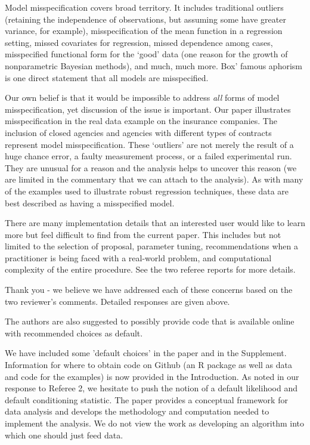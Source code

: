 \documentclass{article}
\newcommand{\response}[1]{{\color{blue}#1}}
\begin{document}
\response{Model misspecification covers broad territory.  It includes traditional outliers (retaining the independence of observations, but assuming some have greater variance, for example), misspecification of the mean function in a regression setting, missed covariates for regression, missed dependence among cases, misspecified functional form for the `good' data (one reason for the growth of nonparametric Bayesian methods), and much, much more.  Box' famous aphorism is one direct statement that all models are misspecified.  

Our own belief is that it would be impossible to address {\em all} forms of model misspecification, yet discussion of the issue is important.  Our paper illustrates misspecification in the real data example on the insurance companies.  The inclusion of closed agencies and agencies with different types of contracts represent model misspecification. These `outliers' are not merely the result of a huge chance error, a faulty measurement process, or a failed experimental run.  They are unusual for a reason and the analysis helps to uncover this reason (we are limited in the commentary that we can attach to the analysis).  As with many of the examples used to illustrate robust regression techniques, these data are best described as having a misspecified model.}

There are many implementation details that an interested user would like to learn more but feel difficult to find from the current paper. This includes but not limited to the selection of proposal, parameter tuning, recommendations when a practitioner is being faced with a real-world problem, and computational complexity of the entire procedure. See the two referee reports for more details. 

\response{Thank you - we believe we have addressed each of these concerns based on the two reviewer's comments. Detailed responses are given above.}

The authors are also suggested to possibly provide code that is available online with recommended choices as default.


\response{We have included some 'default choices' in the paper and in the Supplement.  Information for where to obtain code on Github (an R package as well as data and code for the examples) is now provided in the Introduction.  As noted in our response to Referee 2, we hesitate to push the notion of a default likelihood and default conditioning statistic.  The paper provides a conceptual framework for data analysis and develops the methodology and computation needed to implement the analysis.  We do not view the work as developing an algorithm into which one should just feed data.}
\end{document}
